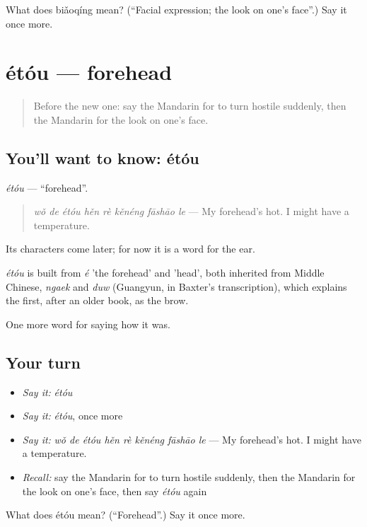 \begin{tcolorbox}[breakable,colback=teal!4,colframe=teal!35!black,title={Before you move on}]
What does biǎoqíng mean? (\textquotedblleft{}Facial expression; the look on one's face\textquotedblright{}.) Say it once more.
\end{tcolorbox}
\section[étóu]{étóu — forehead}

\label{lesson:ZH-C472-etou}



\begin{quote}
Before the new one: say the Mandarin for to turn hostile suddenly, then the Mandarin for the look on one's face.
\end{quote}

\subsection*{You'll want to know: étóu}
\emph{étóu} — \textquotedblleft{}forehead\textquotedblright{}.

\begin{quote}
\emph{wǒ de étóu hěn rè kěnéng fāshāo le} — My forehead's hot. I might have a temperature.
\end{quote}

Its characters come later; for now it is a word for the ear.

\begin{cousinweb}
\emph{étóu} is built from \emph{é} 'the forehead' and  'head', both inherited from Middle Chinese, \emph{ngaek} and \emph{duw} (Guangyun, in Baxter's transcription), which explains the first, after an older book, as the brow.
\end{cousinweb}

\begin{grammarlens}[title={What you've built}]
One more word for saying how it was.
\end{grammarlens}

\subsection*{Your turn}
\begin{itemize}
\raggedright
  \item \emph{Say it:} \emph{étóu}
  \item \emph{Say it:} \emph{étóu}, once more
  \item \emph{Say it:} \emph{wǒ de étóu hěn rè kěnéng fāshāo le} — My forehead's hot. I might have a temperature.
  \item \emph{Recall:} say the Mandarin for to turn hostile suddenly, then the Mandarin for the look on one's face, then say \emph{étóu} again
\end{itemize}

\begin{tcolorbox}[breakable,colback=teal!4,colframe=teal!35!black,title={Before you move on}]
What does étóu mean? (\textquotedblleft{}Forehead\textquotedblright{}.) Say it once more.
\end{tcolorbox}
